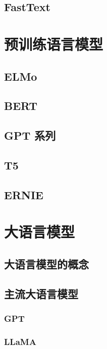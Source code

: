\documentclass[12pt,UTF8]{ctexbook}
\begin{document}
\section{FastText}

\chapter{预训练语言模型}
\label{chap:pretrained_models}

\section{ELMo}

\section{BERT}

\section{GPT 系列}

\section{T5}

\section{ERNIE}

\chapter{大语言模型}
\label{chap:llm}

\section{大语言模型的概念}

\section{主流大语言模型}

\subsection{GPT}

\subsection{LLaMA}
\end{document}
